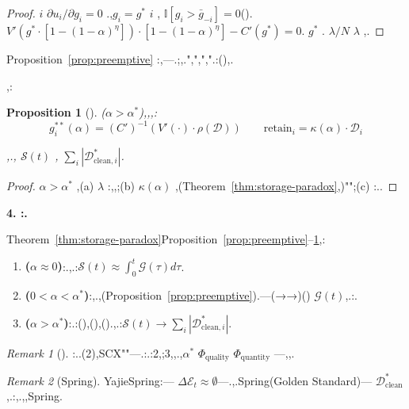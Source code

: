\documentclass[12pt,a4paper]{article}
\newtheorem{proposition}[theorem]{Proposition}
\theoremstyle{definition}
\theoremstyle{remark}
\newtheorem{remark}{Remark}[section]
\begin{document}
\begin{proof}
 $i$  $\partial u_i / \partial g_i = 0$ .,$g_i = g^*$  $i$ , $\mathbb{I}[g_i > \bar{g}_{-i}] = 0$(). $V'(g^* \cdot [1 - (1-\alpha)^{\eta}]) \cdot [1 - (1-\alpha)^{\eta}] - C'(g^*) = 0$. $g^*$ . $\lambda/N$  $\lambda$ ,.
\end{proof}

Proposition~\ref{prop:preemptive} :,\textit{}---.;,.",",",".:(),.

,:

\begin{proposition}[]
\label{prop:mature}
($\alpha > \alpha^*$),,\textit{},:
\begin{equation}
g_i^{**}(\alpha) = (C')^{-1}\left(V'(\cdot) \cdot \rho(\mathcal{D})\right) \quad \text{} \quad \text{retain}_i = \kappa(\alpha) \cdot \mathcal{D}_i
\end{equation}

,., $\mathcal{S}(t)$ , $\sum_i |\mathcal{D}_{\text{clean}, i}^*|$.
\end{proposition}

\begin{proof}
 $\alpha > \alpha^*$ ,(a)  $\lambda$ :,,;(b)  $\kappa(\alpha)$ ,(Theorem~\ref{thm:storage-paradox},)"";(c) :..
\end{proof}

\medskip
\noindent\textbf{4. :.}

Theorem~\ref{thm:storage-paradox}Proposition~\ref{prop:preemptive}–\ref{prop:mature},:

\begin{enumerate}[label=\textbf{ \arabic*}:, leftmargin=*]
\item \textbf{($\alpha \approx 0$)}:.,.:$\mathcal{S}(t) \approx \int_0^t \mathcal{G}(\tau) d\tau$.

\item \textbf{($0 < \alpha < \alpha^*$)}:,.,(Proposition~\ref{prop:preemptive}).\textit{}---(→→)() $\mathcal{G}(t)$,.:.

\item \textbf{($\alpha > \alpha^*$)}:.:(),(),().,.:$\mathcal{S}(t) \to \sum_i |\mathcal{D}_{\text{clean}, i}^*|$.
\end{enumerate}

\begin{remark}[]
:\textit{}..(2),SCX""---.:.:2,;3,,.,$\alpha^*$  $\Phi_{\text{quality}}$  $\Phi_{\text{quantity}}$ ---,,.
\end{remark}

\begin{remark}[Spring]
\label{rem:golden-standard}
YajieSpring:--- $\Delta\mathcal{E}_t \approx \emptyset$---.,.Spring(Golden Standard)--- $\mathcal{D}_{\text{clean}}^*$,.:,.,,Spring.
\end{remark}
\end{document}
